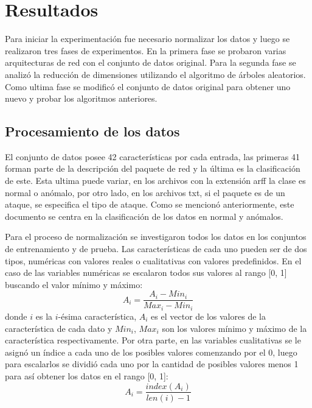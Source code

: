 \chapter{Resultados}\label{chapter:results}

Para iniciar la experimentación fue necesario normalizar los datos y luego se realizaron tres fases de experimentos. En la primera fase se probaron varias arquitecturas de red con el conjunto de datos original. Para la segunda fase se analizó la reducción de dimensiones utilizando el algoritmo de \'arboles aleatorios. Como ultima fase se modificó el conjunto de datos original para obtener uno nuevo y probar los algoritmos anteriores.

\section{Procesamiento de los datos}
El conjunto de datos posee 42 características por cada entrada, las primeras 41 forman parte de la descripción del paquete de red y la última es la clasificación de este. Esta ultima puede variar, en los archivos con la extensión arff la clase es normal o anómalo, por otro lado, en los archivos txt, si el paquete es de un ataque, se especifica el tipo de ataque. Como se mencionó anteriormente, este documento se centra en la clasificación de los datos en normal y anómalos.

Para el proceso de normalización se investigaron todos los datos en los conjuntos de entrenamiento y de prueba. Las características de cada uno pueden ser de dos tipos, numéricas con valores reales o cualitativas con valores predefinidos. En el caso de las variables numéricas se escalaron todos sus valores al rango [0, 1] buscando el valor mínimo y máximo:
\[A_{i} = \frac{A_{i} - Min_{i}}{Max_{i} - Min_{i}}\] 
donde $i$ es la $i$-\'esima característica, $A_{i}$ es el vector de los valores de la característica de cada dato y $Min_{i}$, $Max_{i}$ son los valores mínimo y máximo de la característica respectivamente. Por otra parte, en las variables cualitativas se le asignó un índice a cada uno de los posibles valores comenzando por el 0, luego para escalarlos se dividió cada uno por la cantidad de posibles valores menos 1 para así obtener los datos en el rango [0, 1]:
\[A_{i} = \frac{index(A_{i})}{len(i) - 1}\]

